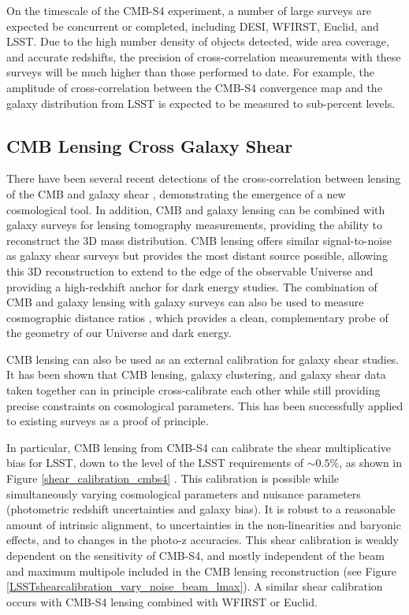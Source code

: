 On the timescale of the CMB-S4 experiment, a number of large surveys are expected be concurrent or completed, including DESI, WFIRST, Euclid, and LSST.  Due to the high number density of objects detected, wide area coverage, and accurate redshifts, the precision of cross-correlation measurements with these surveys will be much higher than those performed to date.  For example, the amplitude of cross-correlation between the CMB-S4 convergence map and the galaxy distribution from LSST is expected to be measured to sub-percent levels.  


\subsection{CMB Lensing Cross Galaxy Shear}\label{lensxlens}


There have been several recent detections of the cross-correlation between lensing of the CMB and galaxy shear \cite{Hand:2013xua, Liu:2015xfa, Kirk:2015dpw}, demonstrating the emergence of a new cosmological tool. In addition, CMB and galaxy lensing can be combined with galaxy surveys for lensing tomography measurements, providing the ability to reconstruct the 3D mass distribution. CMB lensing offers similar signal-to-noise as galaxy shear surveys but provides the most distant source possible, allowing this 3D reconstruction to extend to the edge of the observable Universe and providing a high-redshift anchor for dark energy studies.  The combination of CMB and galaxy lensing with galaxy surveys can also be used to measure cosmographic distance ratios \cite{Miyatake:2016gdc, Singh:2016xey}, which provides a clean, complementary probe of the geometry of our Universe and dark energy. 

CMB lensing can also be used as an external calibration for galaxy shear studies. It has been shown \cite{Vallinotto:2011ge, Vallinotto:2013eva, Das:2013aia} that CMB lensing, galaxy clustering, and galaxy shear data taken together can in principle cross-calibrate each other while still providing precise constraints on cosmological parameters. This has been successfully applied to existing surveys \cite{Liu:2015xfa, Baxter:2016ziy, Miyatake:2016gdc, Singh:2016xey} as a proof of principle. 

In particular, CMB lensing from CMB-S4 can calibrate the shear multiplicative bias for LSST, down to the level of the LSST requirements of $\sim 0.5\%$, as shown in Figure \ref{shear_calibration_cmbs4} \cite{Schaan:2016ois}. This calibration is possible while simultaneously varying cosmological parameters and nuisance parameters (photometric redshift uncertainties and galaxy bias). It is robust to a reasonable amount of intrinsic alignment, to uncertainties in the non-linearities and baryonic effects, and to changes in the photo-z accuracies. This shear calibration is weakly dependent on the sensitivity of CMB-S4, and mostly independent of the beam and maximum multipole included in the CMB lensing reconstruction (see Figure \ref{LSSTshearcalibration_vary_noise_beam_lmax}). A similar shear calibration occurs with CMB-S4 lensing combined with WFIRST or Euclid. 

